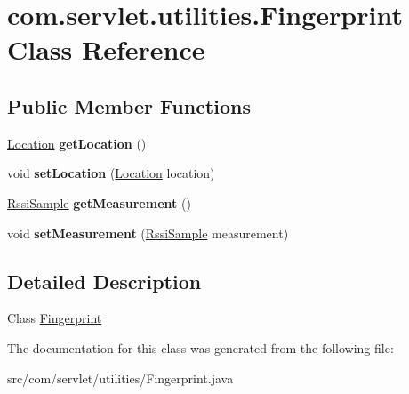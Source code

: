 \hypertarget{classcom_1_1servlet_1_1utilities_1_1_fingerprint}{}\section{com.\+servlet.\+utilities.\+Fingerprint Class Reference}
\label{classcom_1_1servlet_1_1utilities_1_1_fingerprint}
\subsection*{Public Member Functions}
\begin{DoxyCompactItemize}
\item 
\hyperlink{classcom_1_1servlet_1_1utilities_1_1_location}{Location} {\bfseries get\+Location} ()\hypertarget{classcom_1_1servlet_1_1utilities_1_1_fingerprint_a11cf1858d2d1a4d892cadf7014555693}{}\label{classcom_1_1servlet_1_1utilities_1_1_fingerprint_a11cf1858d2d1a4d892cadf7014555693}

\item 
void {\bfseries set\+Location} (\hyperlink{classcom_1_1servlet_1_1utilities_1_1_location}{Location} location)\hypertarget{classcom_1_1servlet_1_1utilities_1_1_fingerprint_af10716bf3f81917f4e21680823f06a3c}{}\label{classcom_1_1servlet_1_1utilities_1_1_fingerprint_af10716bf3f81917f4e21680823f06a3c}

\item 
\hyperlink{classcom_1_1servlet_1_1utilities_1_1_rssi_sample}{Rssi\+Sample} {\bfseries get\+Measurement} ()\hypertarget{classcom_1_1servlet_1_1utilities_1_1_fingerprint_a6a323bdc32e334e4c4cfd625a7af254d}{}\label{classcom_1_1servlet_1_1utilities_1_1_fingerprint_a6a323bdc32e334e4c4cfd625a7af254d}

\item 
void {\bfseries set\+Measurement} (\hyperlink{classcom_1_1servlet_1_1utilities_1_1_rssi_sample}{Rssi\+Sample} measurement)\hypertarget{classcom_1_1servlet_1_1utilities_1_1_fingerprint_ab56d4888055bf83fe06dc44ff6590e4f}{}\label{classcom_1_1servlet_1_1utilities_1_1_fingerprint_ab56d4888055bf83fe06dc44ff6590e4f}

\end{DoxyCompactItemize}


\subsection{Detailed Description}
Class \hyperlink{classcom_1_1servlet_1_1utilities_1_1_fingerprint}{Fingerprint} 

The documentation for this class was generated from the following file\+:\begin{DoxyCompactItemize}
\item 
src/com/servlet/utilities/Fingerprint.\+java\end{DoxyCompactItemize}
